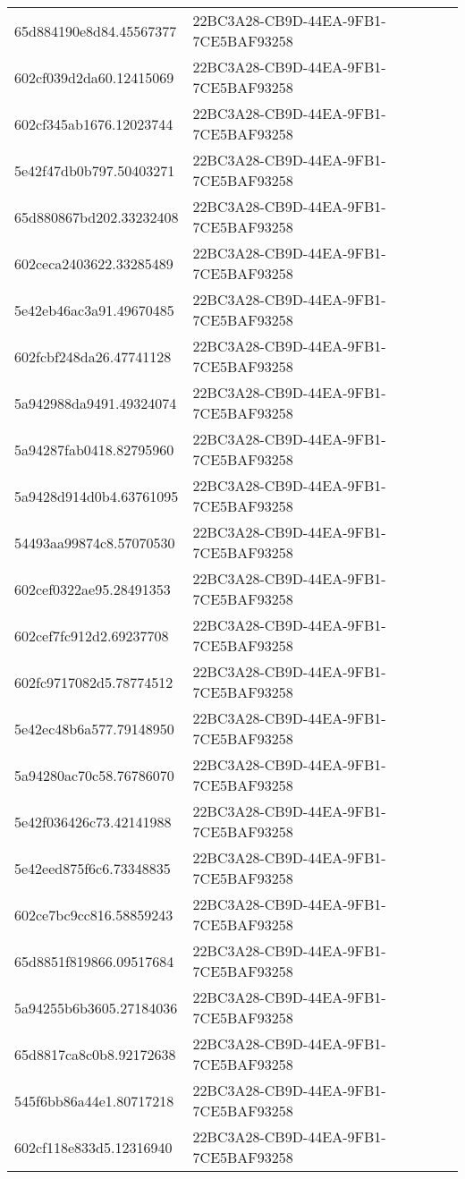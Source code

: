 \begin{tabular}{ll}
65d884190e8d84.45567377 & 22BC3A28-CB9D-44EA-9FB1-7CE5BAF93258 \\
602cf039d2da60.12415069 & 22BC3A28-CB9D-44EA-9FB1-7CE5BAF93258 \\
602cf345ab1676.12023744 & 22BC3A28-CB9D-44EA-9FB1-7CE5BAF93258 \\
5e42f47db0b797.50403271 & 22BC3A28-CB9D-44EA-9FB1-7CE5BAF93258 \\
65d880867bd202.33232408 & 22BC3A28-CB9D-44EA-9FB1-7CE5BAF93258 \\
602ceca2403622.33285489 & 22BC3A28-CB9D-44EA-9FB1-7CE5BAF93258 \\
5e42eb46ac3a91.49670485 & 22BC3A28-CB9D-44EA-9FB1-7CE5BAF93258 \\
602fcbf248da26.47741128 & 22BC3A28-CB9D-44EA-9FB1-7CE5BAF93258 \\
5a942988da9491.49324074 & 22BC3A28-CB9D-44EA-9FB1-7CE5BAF93258 \\
5a94287fab0418.82795960 & 22BC3A28-CB9D-44EA-9FB1-7CE5BAF93258 \\
5a9428d914d0b4.63761095 & 22BC3A28-CB9D-44EA-9FB1-7CE5BAF93258 \\
54493aa99874c8.57070530 & 22BC3A28-CB9D-44EA-9FB1-7CE5BAF93258 \\
602cef0322ae95.28491353 & 22BC3A28-CB9D-44EA-9FB1-7CE5BAF93258 \\
602cef7fc912d2.69237708 & 22BC3A28-CB9D-44EA-9FB1-7CE5BAF93258 \\
602fc9717082d5.78774512 & 22BC3A28-CB9D-44EA-9FB1-7CE5BAF93258 \\
5e42ec48b6a577.79148950 & 22BC3A28-CB9D-44EA-9FB1-7CE5BAF93258 \\
5a94280ac70c58.76786070 & 22BC3A28-CB9D-44EA-9FB1-7CE5BAF93258 \\
5e42f036426c73.42141988 & 22BC3A28-CB9D-44EA-9FB1-7CE5BAF93258 \\
5e42eed875f6c6.73348835 & 22BC3A28-CB9D-44EA-9FB1-7CE5BAF93258 \\
602ce7bc9cc816.58859243 & 22BC3A28-CB9D-44EA-9FB1-7CE5BAF93258 \\
65d8851f819866.09517684 & 22BC3A28-CB9D-44EA-9FB1-7CE5BAF93258 \\
5a94255b6b3605.27184036 & 22BC3A28-CB9D-44EA-9FB1-7CE5BAF93258 \\
65d8817ca8c0b8.92172638 & 22BC3A28-CB9D-44EA-9FB1-7CE5BAF93258 \\
545f6bb86a44e1.80717218 & 22BC3A28-CB9D-44EA-9FB1-7CE5BAF93258 \\
602cf118e833d5.12316940 & 22BC3A28-CB9D-44EA-9FB1-7CE5BAF93258 \\

\end{tabular}
